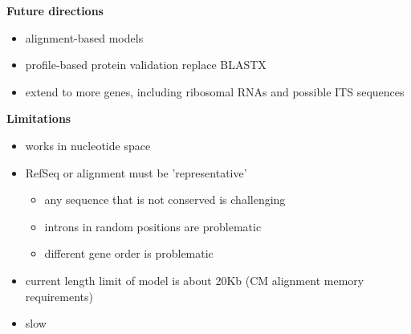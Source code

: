 \documentclass[landscape]{slides}
\begin{document}
\begin{slide}
\begin{center}
\textbf{Future directions}
\end{center}

\begin{itemize}
\item alignment-based models 
\item profile-based protein validation replace BLASTX
\item extend to more genes, including ribosomal RNAs and possible ITS
  sequences 
\end{itemize}

\vfill
\end{slide}
\begin{slide}
\begin{center}
\textbf{Limitations}
\end{center}

\begin{itemize}
\item works in nucleotide space
\item RefSeq or alignment must be 'representative'
  \begin{itemize}
    \item any sequence that is not conserved is challenging
    \item introns in random positions are problematic
    \item different gene order is problematic
  \end{itemize}
\item current length limit of model is about 20Kb (CM alignment memory
  requirements)
\item slow
\end{itemize}

\vfill
\end{slide}
\end{document}
